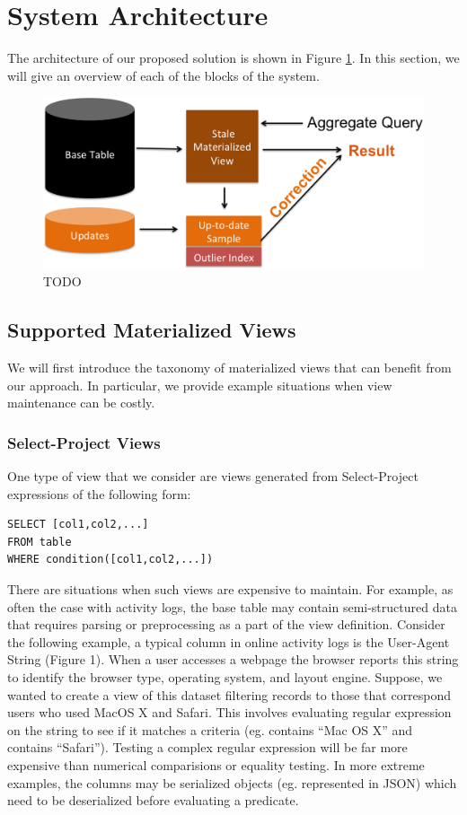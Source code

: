 \section{System Architecture}
The architecture of our proposed solution is shown in Figure \ref{sys-arch}.
In this section, we will give an overview of each of the blocks of the system.

\begin{figure}[h]
\label{sys-arch}
\centering
 \includegraphics[width=\columnwidth]{figs/sys-arch.png}
 \caption{TODO}
\end{figure}

\subsection{Supported Materialized Views}

We will first introduce the taxonomy of materialized views
that can benefit from our approach. In particular, we provide example
situations when view maintenance can be costly. 

\subsubsection{Select-Project Views}

One type of view that we consider are views generated from Select-Project
expressions of the following form:

\begin{lstlisting}
SELECT [col1,col2,...] 
FROM table 
WHERE condition([col1,col2,...]) 
\end{lstlisting}
There are situations when such views are expensive to maintain. For
example, as often the case with activity logs, the base table may
contain semi-structured data that requires parsing or preprocessing
as a part of the view definition. Consider the following example,
a typical column in online activity logs is the User-Agent String
(Figure 1). When a user accesses a webpage the browser reports this
string to identify the browser type, operating system, and layout
engine. Suppose, we wanted to create a view of this dataset filtering
records to those that correspond users who used MacOS X and Safari.
This involves evaluating regular expression on the string to see if
it matches a criteria (eg. contains ``Mac OS X'' and contains ``Safari'').
Testing a complex regular expression will be far more expensive than
numerical comparisions or equality testing. In more extreme examples,
the columns may be serialized objects (eg. represented in JSON) which
need to be deserialized before evaluating a predicate.

